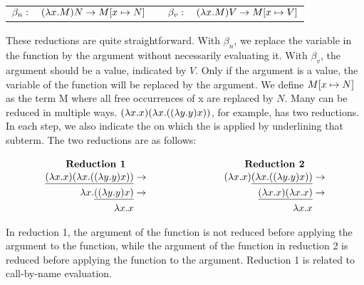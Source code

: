 \vspace{10pt}
\begin{tabular}{c c}
	$\beta_n: \quad (\lambda x.M) N \rightarrow M[{x}\mapsto{N}]$ &
	$\quad \beta_v: \quad (\lambda x.M) V \rightarrow M[{x}\mapsto{V}]$
\end{tabular}

These reductions are quite straightforward. With $\beta_n$, we replace the variable in the function by the argument without necessarily evaluating it.
With $\beta_v$, the argument should be a value, indicated by $V$. Only if the argument is a value, the variable of the function will be replaced by the argument.
We define $M[{x}\mapsto{N}]$ as the term M where all free occurrences of x are replaced by $N$.
\vspace{10pt}
Many \lterms can be reduced in multiple ways. $(\lambda x. x)(\lambda x. ((\lambda y. y) x))$, for example, has two reductions.
In each \br step, we also indicate the \bre on which the \br is applied by underlining that subterm. The two reductions are as follows:

\[
	\begin{array}{c c}
		\parbox[c]{0.5\textwidth}{\centering \textbf{Reduction 1}} & \parbox[c]{0.5\textwidth}{\centering \textbf{Reduction 2}} \\
		\vspace{-10pt}                                                                                                          \\
		\begin{aligned}
			\underline{(\lambda x. x)(\lambda x. ((\lambda y. y) x))} & \rightarrow \\
			\lambda x. \underline{((\lambda y. y) x)}                 & \rightarrow \\
			\lambda x. x
		\end{aligned}
		                                                           &
		\begin{aligned}
			(\lambda x. x)\underline{(\lambda x. ((\lambda y. y) x))} & \rightarrow \\
			\underline{(\lambda x. x)(\lambda x. x)}                  & \rightarrow \\
			\lambda x. x
		\end{aligned}
	\end{array}
\]

\vspace{10pt}
In reduction 1, the argument of the function is not reduced before applying the argument to the function, while the argument of the function in reduction 2 is reduced before applying the function to the argument.
Reduction 1 is related to call-by-name evaluation.

